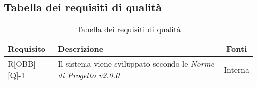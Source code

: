 \subsection{Tabella dei requisiti di qualità}

\begin{center}
	\begin{table}[h]
	\begin{tabular}{|l|p{}|c|}
		\toprule
		
		\textbf{Requisito} & \textbf{Descrizione} & \textbf{Fonti} \\
		
		\midrule
		R[OBB][Q]-1 & Il sistema viene sviluppato secondo le \textit{Norme di Progetto v2.0.0} & Interna \\
		
		\bottomrule

	\end{tabular}
	\caption{Tabella dei requisiti di qualità}
	
	\end{table}
\end{center}
\newpage

